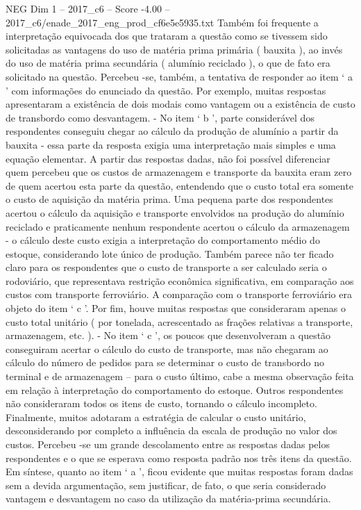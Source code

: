 \begin{textsample}{NEG Dim 1 – 2017\_c6 – Score -4.00 – 2017\_c6/enade\_2017\_eng\_prod\_cf6e5e5935.txt}
Também foi frequente a interpretação equivocada dos que trataram a questão como se tivessem sido solicitadas as vantagens do uso de matéria prima primária ( bauxita ), ao invés do uso de matéria prima secundária ( alumínio reciclado ), o que de fato era solicitado na questão.
Percebeu -se, também, a tentativa de responder ao item ‘ a ’ com informações do enunciado da questão.
Por exemplo, muitas respostas apresentaram a existência de dois modais como vantagem ou a existência de custo de transbordo como desvantagem. - No item ‘ b ’, parte considerável dos respondentes conseguiu chegar ao cálculo da produção de alumínio a partir da bauxita - essa parte da resposta exigia uma interpretação mais simples e uma equação elementar.
A partir das respostas dadas, não foi possível diferenciar quem percebeu que os custos de armazenagem e transporte da bauxita eram zero de quem acertou esta parte da questão, entendendo que o custo total era somente o custo de aquisição da matéria prima.
Uma pequena parte dos respondentes acertou o cálculo da aquisição e transporte envolvidos na produção do alumínio reciclado e praticamente nenhum respondente acertou o cálculo da armazenagem - o cálculo deste custo exigia a interpretação do comportamento médio do estoque, considerando lote único de produção.
Também parece não ter ficado claro para os respondentes que o custo de transporte a ser calculado seria o rodoviário, que representava restrição econômica significativa, em comparação aos custos com transporte ferroviário.
A comparação com o transporte ferroviário era objeto do item ‘ c ’.
Por fim, houve muitas respostas que consideraram apenas o custo total unitário ( por tonelada, acrescentado as frações relativas a transporte, armazenagem, etc. ). - No item ‘ c ’, os poucos que desenvolveram a questão conseguiram acertar o cálculo do custo de transporte, mas não chegaram ao cálculo do número de pedidos para se determinar o custo de transbordo no terminal e de armazenagem – para o custo último, cabe a mesma observação feita em relação à interpretação do comportamento do estoque.
Outros respondentes não consideraram todos os itens de custo, tornando o cálculo incompleto.
Finalmente, muitos adotaram a estratégia de calcular o custo unitário, desconsiderando por completo a influência da escala de produção no valor dos custos.
Percebeu -se um grande descolamento entre as respostas dadas pelos respondentes e o que se esperava como resposta padrão nos três itens da questão.
Em síntese, quanto ao item ‘ a ’, ficou evidente que muitas respostas foram dadas sem a devida argumentação, sem justificar, de fato, o que seria considerado vantagem e desvantagem no caso da utilização da matéria-prima secundária.

\end{textsample}
